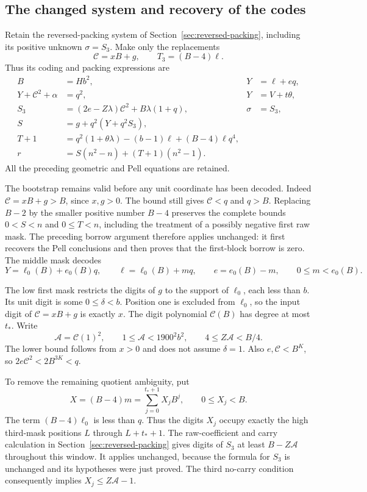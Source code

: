 \subsection{The changed system and recovery of the codes}

Retain the reversed-packing system of
Section~\ref{sec:reversed-packing}, including its positive unknown
$\sigma=S_3$. Make only the replacements
\[
 \mathcal C=xB+g,\qquad T_3=(B-4)\ell.
\]
Thus its coding and packing expressions are
\begin{align*}
 B&=Hb^2,& Y&=\ell+eq,\\
 Y+\mathcal C^2+\alpha&=q^2,&Y&=V+t\theta,\\
 S_3&=(2e-Z\lambda)\mathcal C^2+B\lambda(1+q),&\sigma&=S_3,\\
 S&=g+q^2(Y+q^2S_3),\\
 T+1&=q^2(1+\theta\lambda)-(b-1)\ell+(B-4)\ell q^4,\\
 r&=S(n^2-n)+(T+1)(n^2-1).
\end{align*}
All the preceding geometric and Pell equations are retained.

The bootstrap remains valid before any unit coordinate has been
decoded. Indeed $\mathcal C=xB+g>B$, since $x,g>0$. The bound still
gives $\mathcal C<q$ and $q>B$. Replacing $B-2$ by the smaller positive
number $B-4$ preserves the complete bounds $0<S<n$ and $0\le T<n$,
including the treatment of a possibly negative first raw mask.
The preceding borrow argument therefore applies unchanged: it first
recovers the Pell conclusions and then proves that the first-block
borrow is zero. The middle mask decodes
\[
 Y=\ell_0(B)+e_0(B)q,
 \qquad \ell=\ell_0(B)+mq,
 \qquad e=e_0(B)-m,
 \qquad 0\le m<e_0(B).
\]

The low first mask restricts the digits of $g$ to the support of
$\ell_0$, each less than $b$. Its unit digit is some
$0\le\delta<b$. Position one is excluded from $\ell_0$, so the input
digit of $\mathcal C=xB+g$ is exactly $x$. The digit polynomial
$\mathcal C(B)$ has degree at most $t_*$. Write
\[
 \mathcal A=\mathcal C(1)^2,
 \qquad 1\le\mathcal A<1900^2b^2,
 \qquad 4\le Z\mathcal A<B/4.
\]
The lower bound follows from $x>0$ and does not assume $\delta=1$.
Also $e,\mathcal C<B^K$, so $2e\mathcal C^2<2B^{3K}<q$.

To remove the remaining quotient ambiguity, put
\[
 X=(B-4)m=\sum_{j=0}^{t_*+1}X_jB^j,
 \qquad 0\le X_j<B.
\]
The term $(B-4)\ell_0$ is less than $q$. Thus the digits $X_j$
occupy exactly the high third-mask positions $L$ through $L+t_*+1$.
The raw-coefficient and carry calculation in
Section~\ref{sec:reversed-packing} gives digits of $S_3$ at least
$B-Z\mathcal A$ throughout this window. It applies unchanged, because
the formula for $S_3$ is unchanged and its hypotheses were just proved.
The third no-carry condition consequently implies $X_j\le Z\mathcal A-1$.


